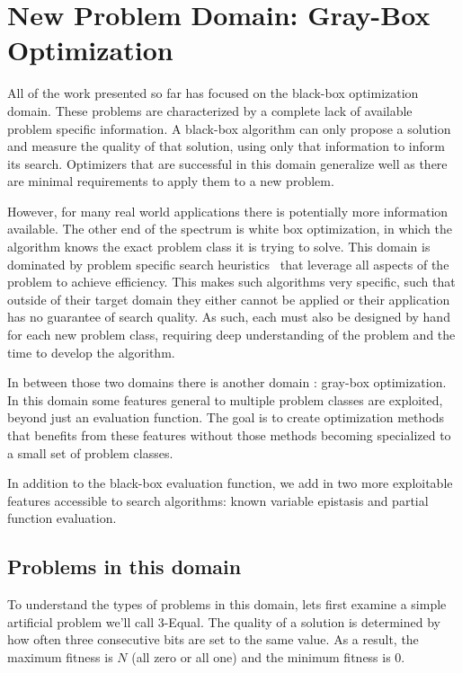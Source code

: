 \chapter{New Problem Domain: Gray-Box Optimization}
\label{chap-graybox}
All of the work presented so far has focused on the black-box optimization
domain. These problems are characterized by a complete lack of available
problem specific information. 
A black-box algorithm can only propose a solution and measure the
quality of that solution, using only that information to inform its search.
Optimizers that are successful in this domain generalize well
as there are minimal requirements to apply them to a new problem.

However, for many real world applications there is potentially more information
available. The other end of the spectrum is white box optimization, in which
the algorithm knows the exact problem class it is trying to solve. This domain
is dominated by problem specific search
heuristics~\cite{een:2004:satsolver,sherrington:1975:isingsolver,wright:2000:solvingnk} that
leverage all aspects of the problem to achieve efficiency. This makes such
algorithms very specific, such that outside of their target domain they
either cannot be applied or 
their application has no guarantee of search quality.
As such,
each must also be designed by hand for each new problem class, requiring
deep understanding of the problem and the time to develop the algorithm.

In between those two domains there is another
domain
: gray-box optimization. In this
domain some features general to multiple problem classes are exploited, beyond
just an evaluation function. The goal is to create optimization methods that
benefits from these features without those methods becoming specialized to
a small set of problem classes.

In addition to the black-box evaluation function, we
add in two more exploitable features accessible to search algorithms:
known variable epistasis and partial function evaluation.

\section{Problems in this domain}
To understand the types of problems in this domain, lets first examine
a simple artificial problem we'll call 3-Equal. The quality
of a solution is determined by how often three consecutive bits are set
to the same value. As a result, %
the maximum fitness is $N$ (all zero or all one) and the minimum fitness
is 0.


